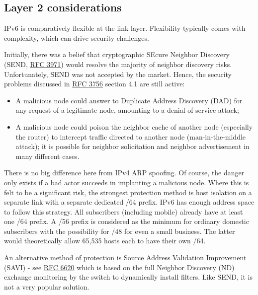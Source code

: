 \documentclass[
]{article}
\providecommand{\tightlist}{%
  \setlength{\itemsep}{0pt}\setlength{\parskip}{0pt}}
\begin{document}
\pagebreak

\subsection{Layer 2 considerations}\label{layer-2-considerations}

IPv6 is comparatively flexible at the link layer. Flexibility typically
comes with complexity, which can drive security challenges.

Initially, there was a belief that cryptographic SEcure Neighbor
Discovery (SEND, \href{https://www.rfc-editor.org/info/rfc3971}{RFC
3971}) would resolve the majority of neighbor discovery risks.
Unfortunately, SEND was not accepted by the market. Hence, the security
problems discussed in \href{https://www.rfc-editor.org/info/rfc3756}{RFC
3756} section 4.1 are still active:

\begin{itemize}
\tightlist
\item
  A malicious node could answer to Duplicate Address Discovery (DAD) for
  any request of a legitimate node, amounting to a denial of service
  attack;
\item
  A malicious node could poison the neighbor cache of another node
  (especially the router) to intercept traffic directed to another node
  (man-in-the-middle attack); it is possible for neighbor solicitation
  and neighbor advertisement in many different cases.
\end{itemize}

There is no big difference here from IPv4 ARP spoofing. Of course, the
danger only exists if a bad actor succeeds in implanting a malicious
node. Where this is felt to be a significant risk, the strongest
protection method is host isolation on a separate link with a separate
dedicated /64 prefix. IPv6 has enough address space to follow this
strategy. All subscribers (including mobile) already have at least one
/64 prefix. A /56 prefix is considered as the minimum for ordinary
domestic subscribers with the possibility for /48 for even a small
business. The latter would theoretically allow 65,535 hosts each to have
their own /64.

An alternative method of protection is Source Address Validation
Improvement (SAVI) - see
\href{https://www.rfc-editor.org/info/rfc6620}{RFC 6620} which is based
on the full Neighbor Discovery (ND) exchange monitoring by the switch to
dynamically install filters. Like SEND, it is not a very popular
solution.
\end{document}
